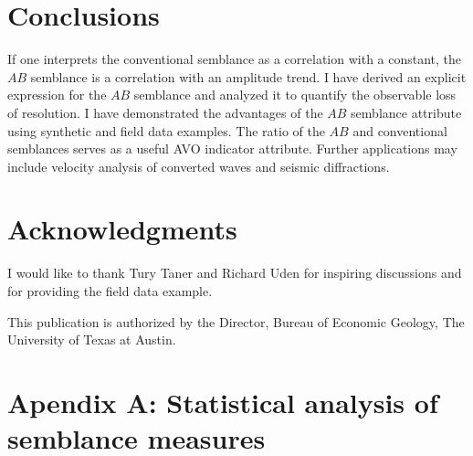 

\section{Conclusions}

If one interprets the conventional semblance as a correlation with a
constant, the $AB$ semblance is a correlation with an amplitude
trend. I have derived an explicit expression for the $AB$ semblance
and analyzed it to quantify the observable loss of resolution. I have
demonstrated the advantages of the $AB$ semblance attribute using
synthetic and field data examples. The ratio of the $AB$ and
conventional semblances serves as a useful AVO indicator
attribute.   Further applications may  include velocity
analysis of converted waves and seismic diffractions.

\section{Acknowledgments}

I would like to thank Tury Taner and Richard Uden for inspiring
discussions and for providing the field data example.

This publication is authorized by the Director, Bureau of Economic
Geology, The University of Texas at Austin.

\appendix
\section{Apendix A: Statistical analysis of semblance measures}

